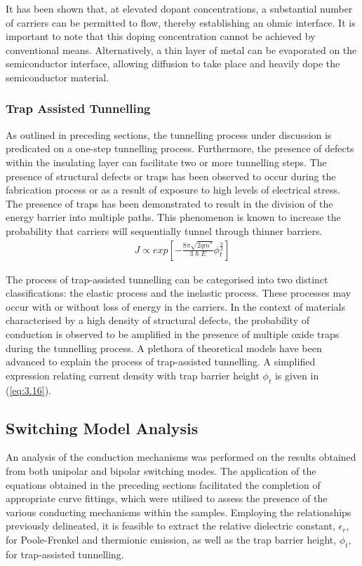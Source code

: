 \noindent It has been shown that, at elevated dopant concentrations, a substantial number of carriers can be permitted to flow, thereby establishing an ohmic interface. It is important to note that this doping concentration cannot be achieved by conventional means. Alternatively, a thin layer of metal can be evaporated on the semiconductor interface, allowing diffusion to take place and heavily dope the semiconductor material.

\subsubsection[Trap Assisted Tunnelling]{Trap Assisted Tunnelling}

As outlined in preceding sections, the tunnelling process under discussion is predicated on a one-step tunnelling process. Furthermore, the presence of defects within the insulating layer can facilitate two or more tunnelling steps. The presence of structural defects or traps has been observed to occur during the fabrication process or as a result of exposure to high levels of electrical stress. The presence of traps has been demonstrated to result in the division of the energy barrier into multiple paths. This phenomenon is known to increase the probability that carriers will sequentially tunnel through thinner barriers.
\begin{align}
    J \propto exp \left[ -\frac{8\pi\sqrt{2qm^*}}{3\hslash E} \phi_t^{\frac{3}{2}} \right] \label{eq:3.16}
\end{align}

\noindent The process of trap-assisted tunnelling can be categorised into two distinct classifications: the elastic process and the inelastic process. These processes may occur with or without loss of energy in the carriers. In the context of materials characterised by a high density of structural defects, the probability of conduction is observed to be amplified in the presence of multiple oxide traps during the tunnelling process. A plethora of theoretical models have been advanced to explain the process of trap-assisted tunnelling. A simplified expression relating current density with trap barrier height $\phi_t$ is given in (\ref{eq:3.16}).

\subsection[Switching Model Analysis]{Switching Model Analysis}

\noindent An analysis of the conduction mechanisms was performed on the results obtained from both unipolar and bipolar switching modes. The application of the equations obtained in the preceding sections facilitated the completion of appropriate curve fittings, which were utilised to assess the presence of the various conducting mechanisms within the samples. Employing the relationships previously delineated, it is feasible to extract the relative dielectric constant, $\epsilon_r$, for Poole-Frenkel and thermionic emission, as well as the trap barrier height, $\phi_t$, for trap-assisted tunnelling. \\

